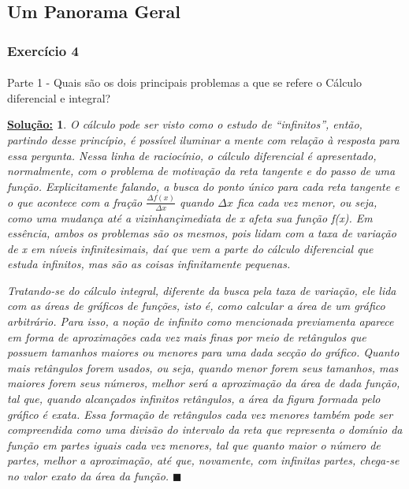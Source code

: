 \documentclass{article}
\newtheorem*{sol*}{\underline{Solu\c c\~ao:}}
\renewcommand\qedsymbol{$\blacksquare$}
\begin{document}
\subsection{Um Panorama Geral}
\subsubsection{Exerc\'icio 4}
\paragraph{} Parte 1 - Quais s\~ao os dois principais problemas a que se refere o C\'alculo diferencial e integral?
\begin{sol*}
O c\'alculo pode ser visto como o estudo de ``infinitos'', ent\~ao, partindo desse princ\'ipio, \'e poss\'ivel iluminar a mente com rela\c c\~ao \`a resposta para essa pergunta. Nessa linha de racioc\'inio, o c\'alculo diferencial \'e apresentado, normalmente, com o problema de motiva\c c\~ao da reta tangente e do passo de uma fun\c c\~ao. Explicitamente falando, a busca do ponto \'unico para cada reta tangente e o que acontece com a fra\c c\~ao $\frac{\Delta{f(x)}}{\Delta{x}}$ quando $\Delta{x}$ fica cada vez menor, ou seja, como uma mudan\c ca at\'e a vizinhan\c c\a imediata de x afeta sua fun\c c\~ao f(x). Em ess\^encia, ambos os problemas s\~ao os mesmos, pois lidam com a taxa de varia\c c\~ao de x em n\'iveis infinitesimais, da\'i que vem a parte do c\'alculo diferencial que estuda infinitos, mas s\~ao as coisas infinitamente pequenas.

Tratando-se do c\'alculo integral, diferente da busca pela taxa de varia\c c\~ao, ele lida com as \'areas de gr\'aficos de fun\c c\~oes, isto \'e, como calcular a \'area de um gr\'afico arbitr\'ario. Para isso, a no\c c\~ao de infinito como mencionada previamenta aparece em forma de aproxima\c c\~oes cada vez mais finas por meio de ret\^angulos que possuem tamanhos maiores ou menores para uma dada sec\c c\~ao do gr\'afico. Quanto mais ret\^angulos forem usados, ou seja, quando menor forem seus tamanhos, mas maiores forem seus n\'umeros, melhor ser\'a a aproxima\c c\~ao da \'area de dada fun\c c\~ao, tal que, quando alcan\c cados infinitos ret\^angulos, a \'area da figura formada pelo gr\'afico \'e exata. Essa forma\c c\~ao de ret\^angulos cada vez menores tamb\'em pode ser compreendida como uma divis\~ao do intervalo da reta que representa o dom\'inio da fun\c c\~ao em partes iguais cada vez menores, tal que quanto maior o n\'umero de partes, melhor a aproxima\c c\~ao, at\'e que, novamente, com infinitas partes, chega-se no valor exato da \'area da fun\c c\~ao.
\qedsymbol
\end{sol*}
\end{document}

